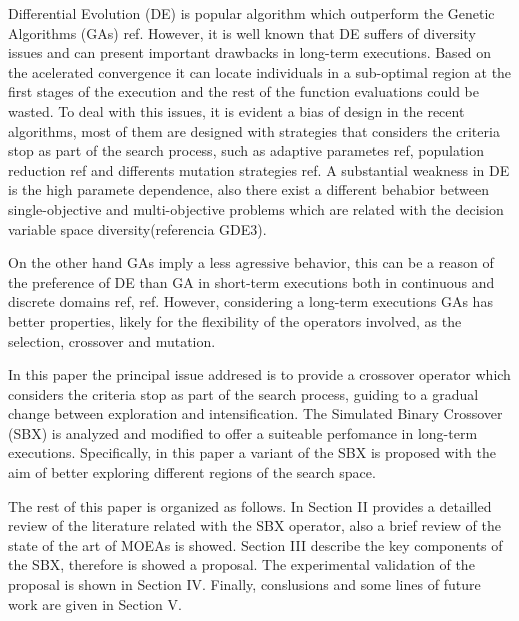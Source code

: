 %
Differential Evolution (DE) is popular algorithm which outperform the Genetic Algorithms (GAs) ref.
%
However, it is well known that DE suffers of diversity issues and can present important drawbacks in long-term executions.
%
Based on the acelerated convergence it can locate individuals in a sub-optimal region at the first stages of the execution and the rest of the function evaluations could be wasted.
%
To deal with this issues, it is evident a bias of design in the recent algorithms, most of them are designed with strategies that considers the criteria stop as part of the search process, such as adaptive parametes ref, population reduction ref and differents mutation strategies ref.
%
A substantial weakness in DE is the high paramete dependence, also there exist a different behabior between single-objective and multi-objective problems which are related with the decision variable space diversity(referencia GDE3).

%
On the other hand GAs imply a less agressive behavior, this can be a reason  of the preference of DE than GA in short-term executions both in continuous and discrete domains ref, ref.
%
However, considering a long-term executions GAs has better properties, likely for the flexibility of the operators involved, as the selection, crossover and  mutation.
%

In this paper the principal issue addresed is to provide a crossover operator which considers the criteria stop as part of the search process, guiding to a gradual change between exploration and intensification.
%
The Simulated Binary Crossover (SBX) is analyzed and modified to offer a suiteable perfomance in long-term executions.
%
Specifically, in this paper a variant of the SBX is proposed with the aim of better exploring different regions of the search space.
%

The rest of this paper is organized as follows.
%
In Section II provides a detailled review of the literature related with the SBX operator, also a brief review of the state of the art of MOEAs is showed.
%
Section III describe the key components of the SBX, therefore is showed a proposal.
%
The experimental validation of the proposal is shown in Section IV.
%
Finally, conslusions and some lines of future work are given in Section V.
